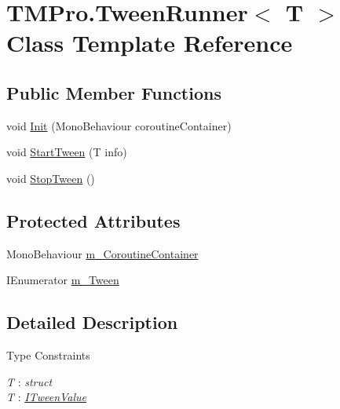 \hypertarget{class_t_m_pro_1_1_tween_runner}{}\section{T\+M\+Pro.\+Tween\+Runner$<$ T $>$ Class Template Reference}
\label{class_t_m_pro_1_1_tween_runner}
\subsection*{Public Member Functions}
\begin{DoxyCompactItemize}
\item 
void \mbox{\hyperlink{class_t_m_pro_1_1_tween_runner_a7af4db815f3367dbab643a84e6680916}{Init}} (Mono\+Behaviour coroutine\+Container)
\item 
void \mbox{\hyperlink{class_t_m_pro_1_1_tween_runner_ac433f6e5ac92706935adf751b482231d}{Start\+Tween}} (T info)
\item 
void \mbox{\hyperlink{class_t_m_pro_1_1_tween_runner_a9f415377a8d07a95d65c68ea400b1c72}{Stop\+Tween}} ()
\end{DoxyCompactItemize}
\subsection*{Protected Attributes}
\begin{DoxyCompactItemize}
\item 
Mono\+Behaviour \mbox{\hyperlink{class_t_m_pro_1_1_tween_runner_a7dc1ce8abefe863ae28aa4f99568c4ab}{m\+\_\+\+Coroutine\+Container}}
\item 
I\+Enumerator \mbox{\hyperlink{class_t_m_pro_1_1_tween_runner_a74047a063eeebdbf3c571976dfb944e0}{m\+\_\+\+Tween}}
\end{DoxyCompactItemize}


\subsection{Detailed Description}
\begin{Desc}
\item[Type Constraints]\begin{description}
\item[{\em T} : {\em struct}]\item[{\em T} : {\em \mbox{\hyperlink{interface_t_m_pro_1_1_i_tween_value}{I\+Tween\+Value}}}]\end{description}
\end{Desc}



